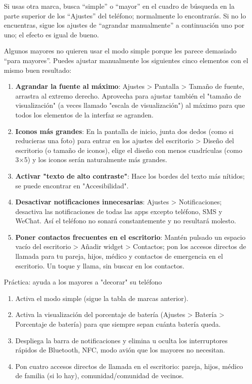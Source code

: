 Si usas otra marca, busca “simple” o “mayor” en el cuadro de búsqueda en la parte superior de los “Ajustes” del teléfono; normalmente lo encontrarás. Si no lo encuentras, sigue los ajustes de “agrandar manualmente” a continuación uno por uno; el efecto es igual de bueno.


Algunos mayores no quieren usar el modo simple porque les parece demasiado “para mayores”. Puedes ajustar manualmente los siguientes cinco elementos con el mismo buen resultado:

\begin{enumerate}
  \item \textbf{Agrandar la fuente al máximo}: Ajustes > Pantalla > Tamaño de fuente, arrastra al extremo derecho. Aprovecha para ajustar también el "tamaño de visualización" (a veces llamado "escala de visualización") al máximo para que todos los elementos de la interfaz se agranden.
  \item \textbf{Iconos más grandes}: En la pantalla de inicio, junta dos dedos (como si reducieras una foto) para entrar en los ajustes del escritorio > Diseño del escritorio (o tamaño de iconos), elige el diseño con menos cuadrículas (como 3×5) y los iconos serán naturalmente más grandes.
  \item \textbf{Activar "texto de alto contraste"}: Hace los bordes del texto más nítidos; se puede encontrar en "Accesibilidad".
  \item \textbf{Desactivar notificaciones innecesarias}: Ajustes > Notificaciones; desactiva las notificaciones de todas las apps excepto teléfono, SMS y WeChat. Así el teléfono no sonará constantemente y no resultará molesto.
  \item \textbf{Poner contactos frecuentes en el escritorio}: Mantén pulsado un espacio vacío del escritorio > Añadir widget > Contactos; pon los accesos directos de llamada para tu pareja, hijos, médico y contactos de emergencia en el escritorio. Un toque y llama, sin buscar en los contactos.
\end{enumerate}

\begin{tcbpractice}{Práctica: ayuda a los mayores a "decorar" su teléfono}
\begin{enumerate}
  \item Activa el modo simple (sigue la tabla de marcas anterior).
  \item Activa la visualización del porcentaje de batería (Ajustes > Batería > Porcentaje de batería) para que siempre sepan cuánta batería queda.
  \item Despliega la barra de notificaciones y elimina u oculta los interruptores rápidos de Bluetooth, NFC, modo avión que los mayores no necesitan.
  \item Pon cuatro accesos directos de llamada en el escritorio: pareja, hijos, médico de familia (si lo hay), comunidad/comunidad de vecinos.
\end{enumerate}

\end{tcbpractice}

